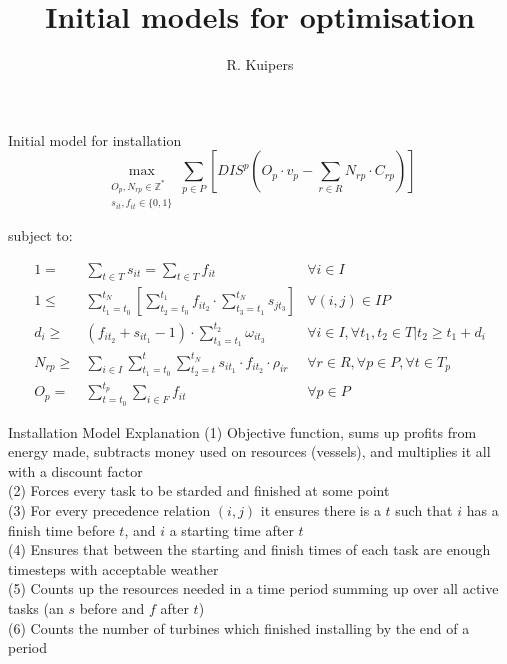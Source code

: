 \documentclass{beamer}
\title[Initial models for optimisation]{Initial models for optimisation}
\author{R. Kuipers}
\begin{document}
\begin{frame}
  \titlepage
\end{frame}

\begin{frame}{Initial model for installation}
\footnotesize
\begin{equation}
	\max_{\substack{O_p, N_{rp} \in \mathbb{Z}^* \\ s_{it}, f_{it} \in \{0, 1\}}} \sum_{p \in P} [ DIS^p (O_p \cdot v_p - \sum_{r \in R} N_{rp} \cdot C_{rp}) ]
\end{equation}

\bigskip
subject to:

\begin{align}
1 =& \sum_{t \in T} s_{it}	= \sum_{t \in T} f_{it}										&	\forall i \in I 						\\
1 \leq& \sum_{t_1 = t_0}^{t_N} [ \sum_{t_2 = t_0}^{t_1} f_{it_2} \cdot \sum_{t_3 = t_1}^{t_N} s_{jt_3} ]	&	\forall (i, j) \in IP					\\
d_i \geq& (f_{it_2} + s_{it_1} - 1) \cdot \sum_{t_3 = t_1}^{t_2} \omega_{it_3} 							& 	\forall i \in I, 	\forall t_1, t_2 \in T | t_2 \geq t_1 + d_i	\\
N_{rp} \geq& \sum_{i\in I} \sum_{t_1 = t_0}^t \sum_{t_2 = t}^{t_N} s_{it_1} \cdot f_{it_2} \cdot \rho_{ir}	& 	\forall r \in R, \forall p \in P, \forall t \in T_p 	\\
O_p =&  \sum_{t = t_0}^{t_p} \sum_{i \in F} f_{it}									&	\forall p \in P
\end{align}

\end{frame}

\begin{frame}{Installation Model Explanation}
(1) Objective function, sums up profits from energy made, subtracts money used on resources (vessels), and multiplies it all with a discount factor	\\
(2) Forces every task to be starded and finished at some point	\\
(3) For every precedence relation $(i, j)$ it ensures there is a $t$ such that $i$ has a finish time before $t$, and $i$ a starting time after $t$	\\
(4) Ensures that between the starting and finish times of each task are enough timesteps with acceptable weather	\\
(5) Counts up the resources needed in a time period summing up over all active tasks (an $s$ before and $f$ after $t$)	\\
(6) Counts the number of turbines which finished installing by the end of a period	
\end{frame}
\end{document}
